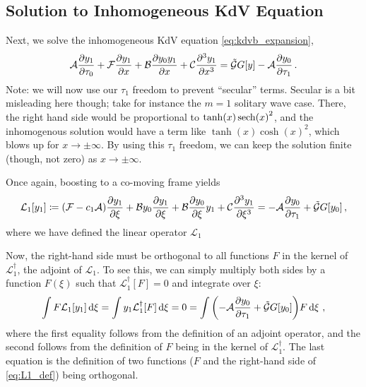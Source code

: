 \documentclass{jfm}
\let\Oldsubsection\subsection
\renewcommand{\subsection}{\FloatBarrier\Oldsubsection}
\begin{document}
\subsection{\label{eq:kdv_inhom_solution} Solution to Inhomogeneous KdV
Equation}
Next, we solve the inhomogeneous KdV equation \cref{eq:kdvb_expansion},
\begin{equation}
  \mathcal{A} \pdv{y_1}{\tau_0} + \mathcal{F} \pdv{y_1}{x} + \mathcal{B}
  \pdv{y_0 y_1}{x} + \mathcal{C} \pdv[3]{y_1}{x} = \mathcal{\tilde{G}}
  G[y] - \mathcal{A} \pdv{y_0}{\tau_1} \,.
\end{equation}
Note: we will now use our $\tau_1$ freedom to prevent ``secular'' terms.
Secular is a bit misleading here though; take for instance the $m=1$
solitary wave case.
There, the right hand side would be proportional to $\tanh(x)
\sech(x)^2$, and the inhomogenous solution would have a term like
$\tanh(x) \cosh(x)^2$, which blows up for $x \to \pm \infty$.
By using this $\tau_1$ freedom, we can keep the solution finite (though,
not zero) as $x \to \pm \infty$.

Once again, boosting to a co-moving frame yields
\begin{equation}
  \mathcal{L}_{1} [y_1] \coloneqq
    \pqty{\mathcal{F} -c_1 \mathcal{A}} \pdv{y_1}{\xi}
    + \mathcal{B} y_0 \pdv{y_1}{\xi}
    + \mathcal{B} \pdv{y_0}{\xi} y_1
    + \mathcal{C} \pdv[3]{y_1}{\xi}
  = - \mathcal{A} \pdv{y_0}{\tau_1}
    + \mathcal{\tilde{G}} G[y_0] \,,
  \label{eq:L1_def}
\end{equation}
where we have defined the linear operator $\mathcal{L}_{1}$

Now, the right-hand side must be orthogonal to all functions $F$ in the
kernel of $\mathcal{L}_1^{\dagger}$, \ie the adjoint of
$\mathcal{L}_1$.
To see this, we can simply multiply both sides by a function $F(\xi)$
such that $\mathcal{L}_1^{\dagger}[F] = 0$ and integrate over $\xi$:
\begin{equation}
  \int F \mathcal{L}_1 [y_1] \dd{\xi}
  = \int y_1 \mathcal{L}_1^{\dagger} [F] \dd{\xi}
  = 0
  =
  \int \pqty{- \mathcal{A} \pdv{y_0}{\tau_1} + \mathcal{\tilde{G}}
    G[y_0] } F \dd{\xi} \,,
\end{equation}
where the first equality follows from the definition of an adjoint
operator, and the second follows from the definition of $F$ being in the
kernel of $\mathcal{L}_1^{\dagger}$.
The last equation is the definition of two functions ($F$ and the
right-hand side of \cref{eq:L1_def}) being orthogonal.
\end{document}
